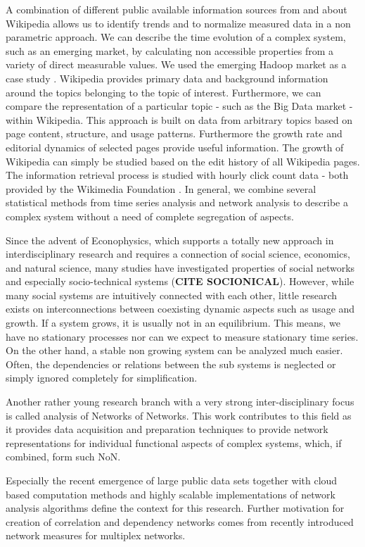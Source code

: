 \documentclass[a4paper,10pt]{scrbook}
\begin{document}
A combination of different public available information sources from and about Wikipedia allows us to identify trends and to normalize measured data in a non parametric approach. We can describe the time evolution of a complex system, such as an emerging market, by calculating non accessible properties from a variety of direct measurable values. We used the emerging Hadoop market as a case study \cite{Kaempf2015}. Wikipedia provides primary data and background information around the topics belonging to the topic of interest. Furthermore, we can compare the representation of a particular topic - such as the Big Data market - within Wikipedia. This approach is built on data from arbitrary topics based on page content, structure, and usage patterns. Furthermore the growth rate and editorial dynamics of selected pages provide useful information. The growth of Wikipedia can simply be studied based on the edit history of all Wikipedia pages. The information retrieval process is studied with hourly click count data - both provided by the Wikimedia Foundation \cite{WikipediaFoundation}. In general, we combine several statistical methods from time series analysis and network analysis to describe a complex system without a need of complete segregation of aspects. 

Since the advent of Econophysics, which supports a totally new approach in interdisciplinary research and requires a connection of social science, economics, and natural science, many studies have investigated properties of social networks and especially socio-technical systems (\textbf{CITE SOCIONICAL}). However, while many social systems are intuitively connected with each other, little research exists on interconnections between coexisting dynamic aspects such as usage and growth. If a system grows, it is usually not in an equilibrium. This means, we have no stationary processes nor can we expect to measure stationary time series. On the other hand, a stable non growing system can be analyzed much easier. Often, the dependencies or relations between the sub systems is neglected or simply ignored completely for simplification. 

Another rather young research branch with a very strong inter-disciplinary focus is called analysis of Networks of Networks. This work contributes to this field as it provides data acquisition and preparation techniques to provide network representations for individual functional aspects of complex systems, which, if combined, form such NoN.  

Especially the recent emergence of large public data sets together with cloud based computation methods and highly scalable implementations of network analysis algorithms define the context for this research. Further motivation for creation of correlation and dependency networks comes from recently introduced network measures for multiplex networks.
\end{document}
